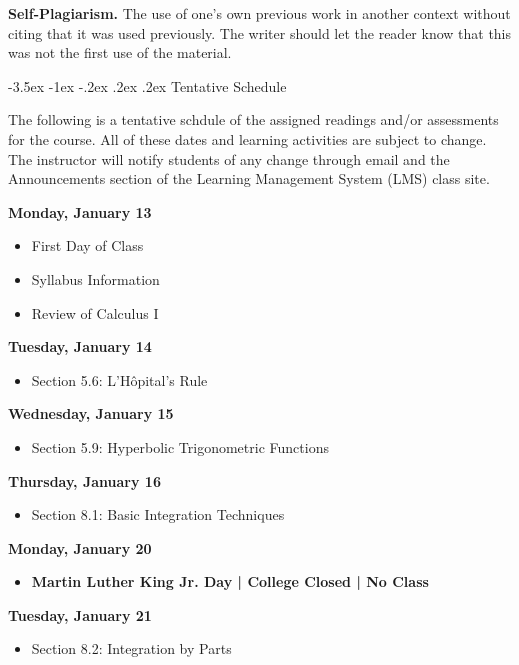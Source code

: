 \documentclass[11pt]{article}
\makeatletter
\renewcommand\section{\@startsection{section}{1}{0pt}%
  {-3.5ex \@plus -1ex \@minus -.2ex}%
  {.2ex \@plus.2ex}%
  {\normalfont\Large\bfseries}} %
\makeatother
\begin{document}
\textbf{Self-Plagiarism.} The use of one's own previous work in another context without citing that it was used previously. The writer should let the reader know that this was not the first use of the material.

\pagebreak
\section{Tentative Schedule}

The following is a tentative schdule of the assigned readings and/or assessments for the course. All of these dates and learning activities are subject to change. The instructor will notify students of any change through email and the Announcements section of the Learning Management System (LMS) class site.

\textbf{Monday, January 13}

\begin{itemize}
\item First Day of Class
\item Syllabus Information
\item Review of Calculus I
\end{itemize}

\textbf{Tuesday, January 14}

\begin{itemize}
\item Section 5.6: L'Hôpital's Rule
\end{itemize}

\textbf{Wednesday, January 15}

\begin{itemize}
\item Section 5.9: Hyperbolic Trigonometric Functions
\end{itemize}

\textbf{Thursday, January 16}

\begin{itemize}
\item Section 8.1: Basic Integration Techniques
\end{itemize}

\textbf{Monday, January 20}

\begin{itemize}
\item \textbf{Martin Luther King Jr. Day | College Closed | No Class}
\end{itemize}

\textbf{Tuesday, January 21}

\begin{itemize}
\item Section 8.2: Integration by Parts
\end{itemize}
\end{document}
